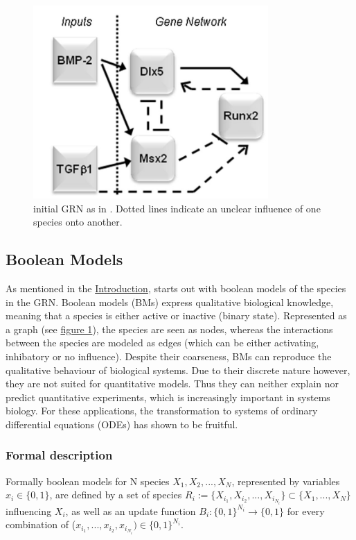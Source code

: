 \documentclass[11pt]{article}
\begin{document}
\begin{figure}[hb]
  \centering
  \includegraphics[width=0.8\textwidth]{regulatory_network.jpg}
  \caption{\label{regulatory_network} initial GRN as in \cite{Kirkham}. Dotted lines indicate an unclear influence of one species onto another.}
\end{figure}

\subsection{Boolean Models}
As mentioned in the \hyperref[sec:Intro]{Introduction}, \cite{Kirkham} starts out with boolean models of the
species in the GRN. Boolean models (BMs) express qualitative biological knowledge, meaning that a species is either active or inactive (binary state). Represented as a graph (see \hyperref[regulatory_network]{figure 1}), the species are seen as nodes, whereas the interactions between the species are modeled as edges (which can be either activating, inhibatory or no influence).
Despite their coarseness, BMs can reproduce the qualitative behaviour of biological systems.
Due to their discrete nature however, they are not suited for quantitative models. Thus they can neither explain nor predict quantitative experiments, which is increasingly important in systems biology. For these applications,
the transformation to systems of ordinary differential equations (ODEs) has shown to be fruitful.

\subsubsection{Formal description}
Formally boolean models for N species $X_{1}, X_{2},..., X_{N}$, represented by variables $x_{i} \in \{0, 1\}$, are
defined by a set of species $R_{i} := \{X_{i_{1}}, X_{i_{2}},..., X_{i_{N_{i}}}\} \subset
\{X_{1},...,X_{N}\}$ influencing $X_{i}$, as well as an update function $B_{i}: \{0, 1\}^{N_{i}} \rightarrow \{0, 1\}$ for every combination of ($x_{i_{1}},..., x_{i_{2}}, x_{i_{N_{i}}}) \in \{0, 1\}^{N_{i}}$.
\end{document}
